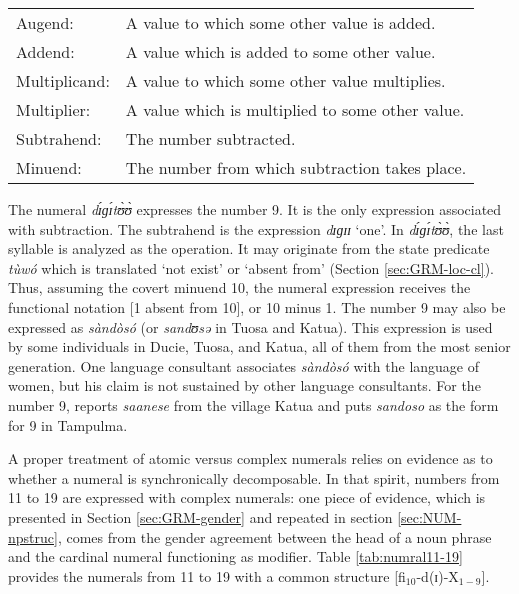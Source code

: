 \begin{exe}
\begin{exe}
\begin{exe}
{\begin{exe}
\begin{exe}
\begin{exe}
\begin{exe}
\begin{exe}
\begin{exe}
\begin{exe}
\begin{xlist}
\begin{exe}
\begin{exe}
\begin{exe}
\vspace{3ex}

\begin{tabular}{ll}
{ Augend:} & A value to which some other value is
added.\\
{ Addend:} & A value which is added to some other
value.\\
{ Multiplicand:} & A value to which some other
value multiplies.\\

{ Multiplier:} & A value which is multiplied to
some other value. \\

{ Subtrahend:}  & The number subtracted.\\
{ Minuend:}  & The number from which subtraction takes
place.\\
\end{tabular}
\vspace*{10pt}


The numeral {\it dɪ́ɡɪ́tʊ̀ʊ̀} expresses the number 9. It is the only
expression associated with subtraction.  The subtrahend is the expression {\it 
dɪɡɪɪ} `one'.   In {\it dɪ́ɡɪ́tʊ̀ʊ̀},  the last syllable   is analyzed
as the
operation. It may originate from the state predicate  {\it tùwó} which is
translated 
`not exist'  or `absent from' (Section \ref{sec:GRM-loc-cl}). Thus, assuming the
covert minuend 10, the numeral
expression receives the functional notation [1 {\sc absent from} 10], or 10
minus 1.  The number 9 may also be expressed as {\it sàndòsó}  (or
{\it sandʊsə} in Tuosa and Katua). This expression is
used by some individuals in Ducie, Tuosa, and Katua, all of them from the most
senior generation.  One language consultant
associates  {\it sàndòsó} with the language of women, but his claim is not
sustained by other language consultants. For the number 9, \citet[33]{Good54}
reports
{\it saanese}
from the village Katua and  \citet[117]{Ratt32b} puts {\it sandoso} as the form
 for 9 in Tampulma. 

 
A proper  treatment of  atomic versus  complex numerals   relies  on evidence as
to whether
a numeral is synchronically  decomposable. In  that spirit,  numbers from 
11 to 19 are expressed with  complex numerals:  one piece of evidence, which is
presented in Section \ref{sec:GRM-gender} and repeated in section
\ref{sec:NUM-npstruc}, comes from the gender agreement between the head of a
noun phrase and the
cardinal numeral functioning as modifier.  Table \ref{tab:numral11-19}
provides the  numerals from 11 to 19 with a common structure
[fi$_{10}$-d(ɪ)-X$_{1-9}$]. 





\end{exe}
\end{exe}
\end{exe}
\end{xlist}
\end{exe}
\end{exe}
\end{exe}
\end{exe}
\end{exe}
\end{exe}
\end{exe}}
\end{exe}
\end{exe}
\end{exe}
